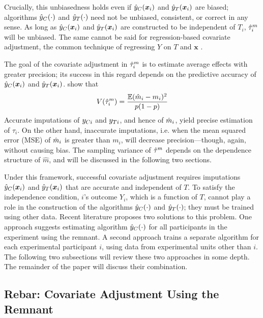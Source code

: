 Crucially, this unbiasedness holds even if $\hat{y}_C(\bm{x}_i)$ and $\hat{y}_T(\bm{x}_i)$ are biased; algorithms $\hat{y}_C(\cdot)$ and $\hat{y}_T(\cdot)$ need not be unbiased, consistent, or correct in any sense.
As long as $\hat{y}_C(\bm{x}_i)$ and $\hat{y}_T(\bm{x}_i)$ are constructed to be independent
of $T_i$, $\hat{\tau}_i^m$ will be unbiased.
The same cannot be said for regression-based covariate
adjustment, the common technique of regressing $Y$ on $T$ and $\bm{x}$
\citep{freedman2008regression}.

The goal of the covariate adjustment in $\hat{\tau}_i^m$ is to estimate average
effects with greater precision;
its success in this regard depends on the predictive accuracy of $\hat{y}_C(\bm{x}_i)$ and $\hat{y}_T(\bm{x}_i)$.
\citet{loop} show that
\begin{equation}
V(\hat{\tau}_i^m)=\frac{\mathbb{E}(\hat{m}_i-m_i)^2}{p(1-p)}
\end{equation}
Accurate imputations of $y_{Ci}$ and $y_{Ti}$, and hence of $\hat{m}_i$, yield precise estimation of $\tau_i$.
On the other hand, inaccurate imputations, i.e. when the mean squared
error (MSE) of $\hat{m}_i$ is greater than $m_i$, will decrease precision---though, again, without
causing bias.
The sampling variance of $\hat{\tau}^m$ depends on the dependence structure of
$\hat{m}$, and will be discussed in the following two sections.

Under this framework, successful covariate adjustment
requires imputations $\hat{y}_C(\bm{x}_i) $ and $\hat{y}_T(\bm{x}_i) $ that are accurate and
independent of $T$.
To satisfy the independence condition, $i$'s outcome $Y_i$, which is a
function of $T$, cannot play a role in the construction of the algorithms $\hat{y}_C(\cdot)$ and
$\hat{y}_T(\cdot)$; they must be trained using other data.
Recent literature proposes two solutions to this problem.
 One approach \citep{rebarEDM} suggests
estimating algorithm $\hat{y}_C(\cdot) $ for all participants in the
experiment using the remnant.
A second approach \citep{loop} trains a separate algorithm for each
experimental participant $i$, using data from experimental units other
than $i$.
The following two subsections will review these two approaches in some
depth.
The remainder of the paper will discuss their combination.

\subsection{Rebar: Covariate Adjustment Using the Remnant}\label{sec:intro.remant}

